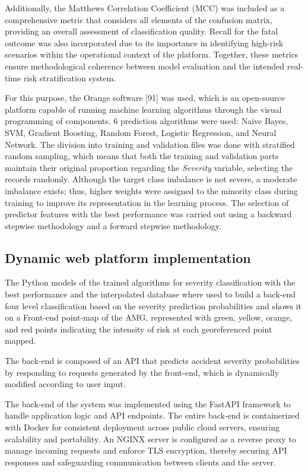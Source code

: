\documentclass[preprint,12pt]{elsarticle}
\begin{document}
Additionally, the Matthews Correlation Coefficient (MCC) was included as a comprehensive metric that considers all elements of the confusion matrix, providing an overall assessment of classification quality. Recall for the fatal outcome was also incorporated due to its importance in identifying high-risk scenarios within the operational context of the platform. Together, these metrics ensure methodological coherence between model evaluation and the intended real-time risk stratification system.

For this purpose, the Orange software [91] was used, which is an open-source platform capable of running machine learning algorithms through the visual programming of components. 6 prediction algorithms were used: Naive Bayes, SVM, Gradient Boosting, Random Forest, Logistic Regression, and Neural Network. The division into training and validation files was done with stratified random sampling, which means that both the training and validation parts maintain their original proportion regarding the \textit{Severity} variable, selecting the records randomly. Although the target class imbalance is not severe, a moderate imbalance exists; thus, higher weights were assigned to the minority class during training to improve its representation in the learning process. 
The selection of predictor features with the best performance was carried out using a backward stepwise methodology and a forward stepwise methodology. 


\subsection{Dynamic web platform implementation}


The Python models of the trained algorithms for severity classification with the best performance and the interpolated database where used to build a back-end four level classification based on the severity prediction probabilities and shows it on a Front-end point-map of the AMG, represented with green, yellow, orange, and red points indicating the intensity of risk at each georeferenced point mapped.

The back-end is composed of an API that predicts accident severity probabilities by responding to requests generated by the front-end, which is dynamically modified according to user input.

The back-end of the system was implemented using the FastAPI framework to handle application logic and API endpoints. The entire back-end is containerized with Docker for consistent deployment across public cloud servers, ensuring scalability and portability. An NGINX server is configured as a reverse proxy to manage incoming requests and enforce TLS encryption, thereby securing API responses and safeguarding communication between clients and the server.
\end{document}
